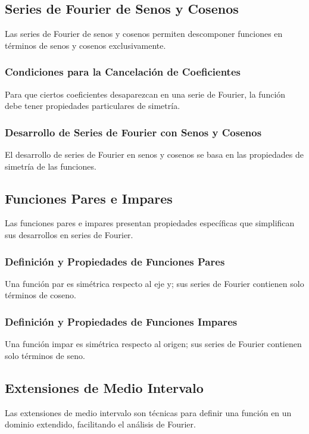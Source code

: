 \subsection{Series de Fourier de Senos y Cosenos}
Las series de Fourier de senos y cosenos permiten descomponer funciones en términos de senos y cosenos exclusivamente.

\subsubsection{Condiciones para la Cancelación de Coeficientes}
Para que ciertos coeficientes desaparezcan en una serie de Fourier, la función debe tener propiedades particulares de simetría.

\subsubsection{Desarrollo de Series de Fourier con Senos y Cosenos}
El desarrollo de series de Fourier en senos y cosenos se basa en las propiedades de simetría de las funciones.

\subsection{Funciones Pares e Impares}
Las funciones pares e impares presentan propiedades específicas que simplifican sus desarrollos en series de Fourier.

\subsubsection{Definición y Propiedades de Funciones Pares}
Una función par es simétrica respecto al eje y; sus series de Fourier contienen solo términos de coseno.

\subsubsection{Definición y Propiedades de Funciones Impares}
Una función impar es simétrica respecto al origen; sus series de Fourier contienen solo términos de seno.

\subsection{Extensiones de Medio Intervalo}
Las extensiones de medio intervalo son técnicas para definir una función en un dominio extendido, facilitando el análisis de Fourier.

